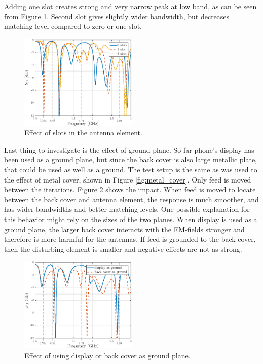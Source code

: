 Adding one slot creates strong and very narrow peak at low band, as can be seen from Figure \ref{fig:slot_res}. Second slot gives slightly wider bandwidth, but decreases matching level compared to zero or one slot.

\begin{figure}[H]
    \centering
    \includegraphics[width=0.5\textwidth]{img/slot_res.eps}
    \caption{Effect of slots in the antenna element.}
    \label{fig:slot_res}
\end{figure}

Last thing to investigate is the effect of ground plane. So far phone's display has been used as a ground plane, but since the back cover is also large metallic plate, that could be used as well as a ground. The test setup is the same as was used to the effect of metal cover, shown in Figure \ref{fig:metal_cover}. Only feed is moved between the iterations. Figure \ref{fig:ground_plane} shows the impact. When feed is moved to locate between the back cover and antenna element, the response is much smoother, and has wider bandwidths and better matching levels. One possible explanation for this behavior might rely on the sizes of the two planes. When display is used as a ground plane, the larger back cover interacts with the EM-fields stronger and therefore is more harmful for the antennas. If feed is grounded to the back cover, then the disturbing element is smaller and negative effects are not as strong.

\begin{figure}[H]
    \centering
    \includegraphics[width=0.5\textwidth]{img/ground_vs_display.eps}
    \caption{Effect of using display or back cover as ground plane.}
    \label{fig:ground_plane}
\end{figure}


